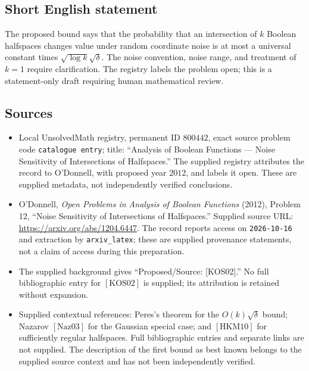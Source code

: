 \documentclass[11pt]{article}
\begin{document}
\subsection{Short English statement}
The proposed bound says that the probability that an intersection of \(k\) Boolean halfspaces changes value under random coordinate noise is at most a universal constant times \(\sqrt{\log k}\sqrt{\delta}\). The noise convention, noise range, and treatment of \(k=1\) require clarification. The registry labels the problem open; this is a statement-only draft requiring human mathematical review.
\subsection{Sources}
\begin{itemize}
\item Local UnsolvedMath registry, permanent ID \(800442\), exact source problem code \texttt{catalogue entry}; title: ``Analysis of Boolean Functions --- Noise Sensitivity of Intersections of Halfspaces.'' The supplied registry attributes the record to O'Donnell, with proposed year \(2012\), and labels it open. These are supplied metadata, not independently verified conclusions.
\item O'Donnell, \emph{Open Problems in Analysis of Boolean Functions} (2012), Problem 12, ``Noise Sensitivity of Intersections of Halfspaces.'' Supplied source URL: \url{https://arxiv.org/abs/1204.6447}. The record reports access on \texttt{2026-10-16} and extraction by \texttt{arxiv\_latex}; these are supplied provenance statements, not a claim of access during this preparation.
\item The supplied background gives ``Proposed/Source: [KOS02].'' No full bibliographic entry for \([\mathrm{KOS02}]\) is supplied; its attribution is retained without expansion.
\item Supplied contextual references: Peres's theorem for the \(O(k)\sqrt{\delta}\) bound; Nazarov \([\mathrm{Naz03}]\) for the Gaussian special case; and \([\mathrm{HKM10}]\) for sufficiently regular halfspaces. Full bibliographic entries and separate links are not supplied. The description of the first bound as best known belongs to the supplied source context and has not been independently verified.
\end{itemize}
\end{document}
